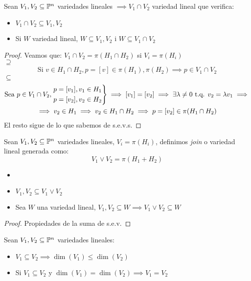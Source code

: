 \begin{prop}
    Sean $V_1, V_2 \subseteq \mathbb{P}^n$ variedades lineales $\implies V_1 \cap V_2$ variedad lineal que verifica:
    \begin{itemize}
        \item $V_1 \cap V_2 \subseteq V_1, V_2$
        \item Si $W$ variedad lineal, $W \subseteq V_1, V_2$ i $W \subseteq V_1 \cap V_2$
    \end{itemize}
\end{prop}
\begin{proof}
    Veamos que: $V_1 \cap V_2 = \pi(H_1 \cap H_2)$ si $V_i = \pi(H_i)$ \\
    $\supseteq$
    \begin{gather*} 
    \text{Si } v \in H_1 \cap H_2, p = [v] \in \pi(H_1), \pi(H_2) \implies p \in V_1 \cap V_2
    \end{gather*}
    $\subseteq$
    \begin{gather*}
        \text{Sea } p \in V_1 \cap V_2,
        \begin{rcases} p = [v_1], v_1 \in H_1 \\ p = [v_2], v_2 \in H_2 \end{rcases} \implies [v_1] = [v_2] \implies
        \exists \lambda \neq 0 \text{ t.q. } v_2 = \lambda v_1 \implies \\ \implies v_2 \in H_1 \implies v_2 \in H_1
        \cap H_2 \implies p = [v_2] \in \pi (H_1 \cap H_2)
    \end{gather*}
    El resto sigue de lo que sabemos de s.e.v.s.
\end{proof}
\begin{defi}
    Sean $V_1, V_2 \subseteq \mathbb{P}^n$ variedades lineales, $V_i = \pi (H_i)$, definimos \textit{join} o variedad lineal generada como:
    \[
    V_1 \vee V_2 = \pi (H_1 + H_2)
    \]
\end{defi}
\begin{prop}
    \begin{itemize}
    \item[]
    \item $V_1, V_2 \subseteq V_1 \vee V_2$
    \item Sea $W$ una variedad lineal, $V_1, V_2 \subseteq W \implies V_1 \vee V_2 \subseteq W$
    \end{itemize}
\end{prop}
\begin{proof}
    Propiedades de la suma de s.e.v.
\end{proof}
\begin{prop}
    Sean $V_1, V_2 \subseteq \mathbb{P}^n$ variedades lineales:
    \begin{itemize}
        \item $V_1 \subseteq V_2 \implies \dim \left( V_1\right) \leq \dim \left( V_2 \right)$
        \item Si $V_1 \subseteq V_2$ y $\dim \left( V_1 \right) = \dim \left( V_2 \right) \implies V_1 = V_2$
    \end{itemize}
\end{prop}
